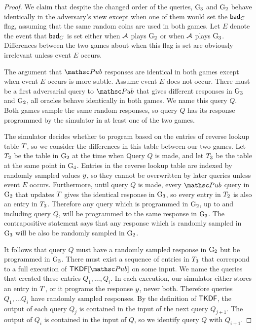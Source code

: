 \begin{proof}
	We claim that despite the changed order of the queries, $\textnormal{G}_3$ and $\textnormal{G}_2$ behave identically in the adversary's view except when one of them would set the $\mathsf{bad}_C$ flag, assuming that the same random coins are used in both games.
	Let $E$ denote the event that $\mathsf{bad}_C$ is set either when $\mathcal{A}$ plays $\textnormal{G}_2$ or when $\mathcal{A}$ plays $\textnormal{G}_3$.
	Differences between the two games about when this flag is set are obviously irrelevant unless event $E$ occurs. 
	
	The argument that $\PubO$ responses are identical in both games except when event $E$ occurs is more subtle.
	Assume event $E$ does not occur.
	There must be a first adversarial query to $\PubO$ that gives different responses in $\textnormal{G}_3$ and $\textnormal{G}_2$, all oracles behave identically in both games.
	We name this query $Q$.
	Both games sample the same random responses, so query $Q$ has its response programmed by the simulator in at least one of the two games.
	
	The simulator decides whether to program based on the entries of reverse lookup table $T$, so we consider the differences in this table between our two games.
	Let $T_2$ be the table in $\textnormal{G}_2$ at the time when Query $Q$ is made, and let $T_3$ be the table at the same point in $\textnormal{G}_4$.
	Entries in the reverse lookup table are indexed by randomly sampled values $y$, so they cannot be overwritten by later queries unless event $E$ occurs.
	Furthermore, until query $Q$ is made, every $\PubO$ query in $\textnormal{G}_2$ that updates $T$ gives the identical response in $\textnormal{G}_3$, so every entry in $T_2$ is also an entry in $T_3$.
	Therefore any query which is programmed in $\textnormal{G}_2$, up to and including query $Q$, will be programmed to the same response in $\textnormal{G}_3$.
	The contrapositive statement says that any response which is randomly sampled in $\textnormal{G}_3$ will be also be randomly sampled in $\textnormal{G}_2$.
	
	It follows that query $Q$ must have a randomly sampled response in $\textnormal{G}_2$ but be programmed in $\textnormal{G}_3$.
	There must exist a sequence of entries in $T_3$ that correspond to a full execution of $\TLSKDF[\PubO]$ on some input. 
	We name the queries that created these entries $Q_1, \ldots, Q_i$. 
	In each execution, our simulator either stores an entry in $T$, or it programs the response $y$, never both.
	Therefore queries $Q_1, \ldots Q_i$ have randomly sampled responses.
	By the definition of $\mathsf{TKDF}$, the output of each query $Q_j$ is contained in the input of the next query $Q_{j+1}$.
	The output of $Q_i$ is contained in the input of $Q$, so we identify query $Q$ with $Q_{i+1}$.
	

\end{proof}
